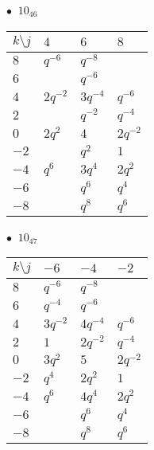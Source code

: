 %
\begin{minipage}{\linewidth}
$\bullet\ $ $10_{46}$ \vspace{0.5em} \\
\begin{tabular}{l|lll}
$k \setminus j$ & $4$ & $6$ & $8$ \\
\hline
$8$ & $q^{-6}$ & $q^{-8}$ &  \\
$6$ &  & $q^{-6}$ &  \\
$4$ & $2q^{-2}$ & $3q^{-4}$ & $q^{-6}$ \\
$2$ &  & $q^{-2}$ & $q^{-4}$ \\
$0$ & $2q^{2}$ & $4$ & $2q^{-2}$ \\
$-2$ &  & $q^{2}$ & $1$ \\
$-4$ & $q^{6}$ & $3q^{4}$ & $2q^{2}$ \\
$-6$ &  & $q^{6}$ & $q^{4}$ \\
$-8$ &  & $q^{8}$ & $q^{6}$ \\
\end{tabular}
\vspace{2em}
\end{minipage}
%
\begin{minipage}{\linewidth}
$\bullet\ $ $10_{47}$ \vspace{0.5em} \\
\begin{tabular}{l|lll}
$k \setminus j$ & $-6$ & $-4$ & $-2$ \\
\hline
$8$ & $q^{-6}$ & $q^{-8}$ &  \\
$6$ & $q^{-4}$ & $q^{-6}$ &  \\
$4$ & $3q^{-2}$ & $4q^{-4}$ & $q^{-6}$ \\
$2$ & $1$ & $2q^{-2}$ & $q^{-4}$ \\
$0$ & $3q^{2}$ & $5$ & $2q^{-2}$ \\
$-2$ & $q^{4}$ & $2q^{2}$ & $1$ \\
$-4$ & $q^{6}$ & $4q^{4}$ & $2q^{2}$ \\
$-6$ &  & $q^{6}$ & $q^{4}$ \\
$-8$ &  & $q^{8}$ & $q^{6}$ \\
\end{tabular}
\vspace{2em}
\end{minipage}
%
